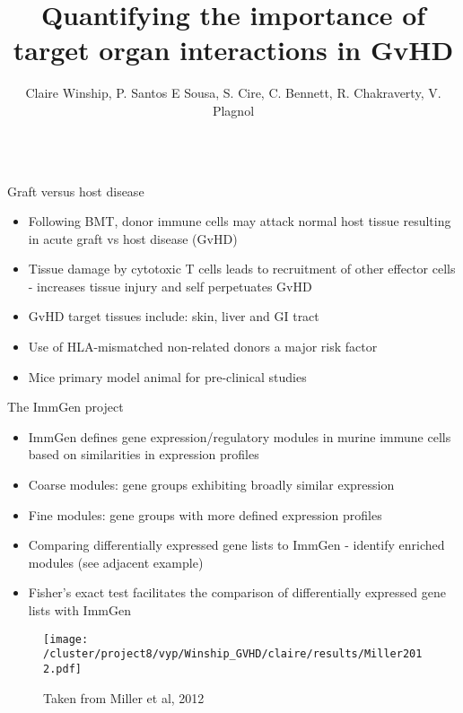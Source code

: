 \documentclass[final,hyperref={pdfpagelabels=false}]{beamer}
\title[GVHD]{Quantifying the importance of target organ interactions in GvHD}
\author[a]{Claire Winship, P. Santos E Sousa, S. Cire, C. Bennett, R. Chakraverty, V. Plagnol}
\begin{document}
\begin{frame}{} 


\begin{columns}[t]
  \begin{column}{.26\linewidth}
    \begin{block}{Graft versus host disease}
\begin{itemize}
      \item Following BMT, donor immune cells may attack normal host tissue resulting in acute graft vs host disease (GvHD)
  \item Tissue damage by cytotoxic T cells leads to recruitment of other effector cells - increases tissue injury and self perpetuates GvHD
      \item GvHD target tissues include: skin, liver and GI tract
  \item Use of HLA-mismatched non-related donors a major risk factor
      \item Mice primary model animal for pre-clinical studies
      \end{itemize}
    \end{block}
\vspace{3cm}
    \begin{block}{The ImmGen project}
\begin{minipage}{0.45\textwidth}
 {\small     \begin{itemize}
      \item ImmGen defines gene expression/regulatory modules in murine immune cells based on similarities in expression profiles 
      \item Coarse modules: gene groups exhibiting broadly similar expression 
	\item Fine modules: gene groups with more defined expression profiles
\item Comparing differentially expressed gene lists to ImmGen - identify enriched modules (see adjacent example)
      \item Fisher's exact test facilitates the comparison of differentially expressed gene lists with ImmGen
      \end{itemize}}
\end{minipage}
\begin{minipage}{0.45\textwidth}
\begin{figure}[!thb]
   \texttt{[image: /cluster/project8/vyp/Winship\_GVHD/claire/results/Miller2012.pdf]}
   \caption{Taken from Miller et al, 2012}
\end{figure}
\end{minipage}

\end{block}
\end{column}
\end{columns}
\end{frame}
\end{document}
